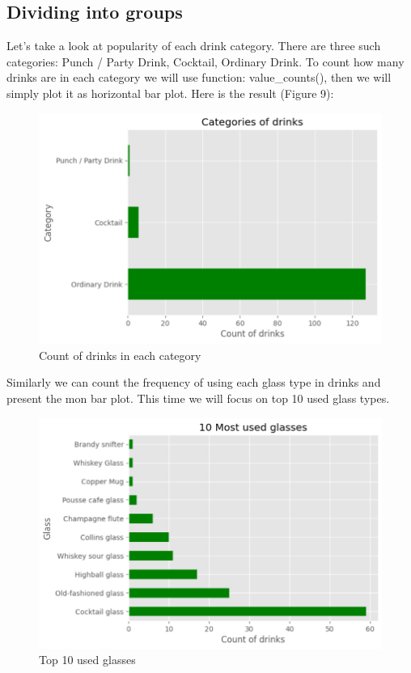 \documentclass[a4paper]{article}
\begin{document}
\subsection{Dividing into groups}
Let's take a look at popularity of each drink category. There are three such categories: Punch / Party Drink, Cocktail, Ordinary Drink. To count how many drinks are in each category we will use function: value\_counts(), then we will simply plot it as horizontal bar plot. Here is the result (Figure 9):

\begin{figure}[H]
    \centering
    \includegraphics[width=0.7\linewidth]{categories.png}
    \caption{Count of drinks in each category}
    \label{fig:enter-label}
\end{figure}

Similarly we can count the frequency of using each glass type in drinks and present the mon bar plot. This time we will focus on top 10 used glass types.

\begin{figure}[H]
    \centering
    \includegraphics[width=0.9\linewidth]{glass types.png}
    \caption{Top 10 used glasses}
    \label{fig:enter-label}
\end{figure}
\end{document}

